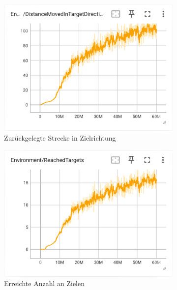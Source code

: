 \begin{figure}[H]
  \centering  
    \begin{subfigure}{.49\textwidth}
      \centering  
      \includegraphics[width=\textwidth]{img/103_move_target_dir}
      \caption{Zurückgelegte Strecke in Zielrichtung}
      \label{fig:103_move_target_dir}
    \end{subfigure}
    \begin{subfigure}{.49\textwidth}
      \centering  
      \includegraphics[width=\textwidth]{img/103_reach_target}
      \caption{Erreichte Anzahl an Zielen}
      \label{fig:103_reach_target}
    \end{subfigure}
    \begin{subfigure}{.49\textwidth}

\end{subfigure}
\end{figure}
